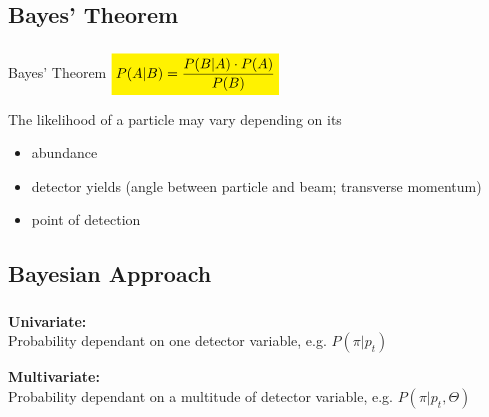 \documentclass{beamer}
\newcommand{\mathcolorbox}[2]{\colorbox{#1}{$\displaystyle #2$}}
\begin{document}
\subsection{Bayes' Theorem}
\begin{frame}
	\frametitle{\insertsection}
	\framesubtitle{\insertsubsection}

	\begin{alertblock}{Bayes' Theorem}
		\centering
		$\mathcolorbox{yellow}{P(A|B) = \frac{P(B|A) \cdot P(A)}{P(B)}}$
	\end{alertblock}
	\vspace{1em}

	The likelihood of a particle may vary depending on its
	\begin{itemize}
		\item abundance
		\item detector yields (angle between particle and beam; transverse momentum)
		\item point of detection
	\end{itemize}
\end{frame}

\subsection{Bayesian Approach}
\begin{frame}
	\frametitle{\insertsection}
	\framesubtitle{\insertsubsection}

	\textbf{Univariate:} \\
	Probability dependant on one detector variable, e.g. $P(\pi|p_t)$ \\

	\vspace{2em}

	\textbf{Multivariate:} \\
	Probability dependant on a multitude of detector variable, e.g. $P(\pi|p_t, \Theta)$
\end{frame}
\end{document}
